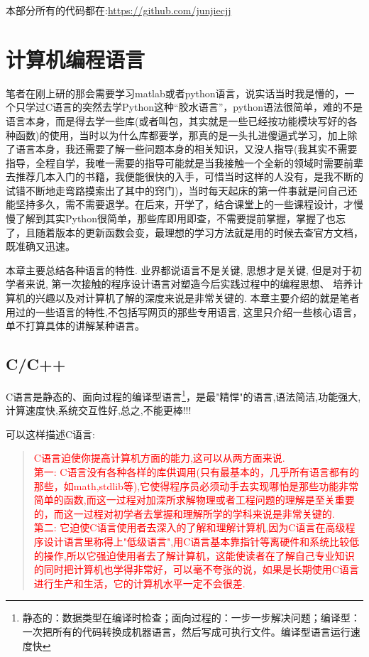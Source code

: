 \documentclass[utf8]{book}
\begin{document}
 

	\noindent 本部分所有的代码都在:{\normalsize \url{https://github.com/junjiecjj}}
\chapter{计算机编程语言}
	
	笔者在刚上研的那会需要学习matlab或者python语言，说实话当时我是懵的，一个只学过C语言的突然去学Python这种“胶水语言”，python语法很简单，难的不是语言本身，而是得去学一些库(或者叫包，其实就是一些已经按功能模块写好的各种函数)的使用，当时以为什么库都要学，那真的是一头扎进傻逼式学习，加上除了语言本身，我还需要了解一些问题本身的相关知识，又没人指导(我其实不需要指导，全程自学，我唯一需要的指导可能就是当我接触一个全新的领域时需要前辈去推荐几本入门的书籍，我便能很快的入手，可惜当时这样的人没有，是我不断的试错不断地走弯路摸索出了其中的窍门)，当时每天起床的第一件事就是问自己还能坚持多久，需不需要退学。在后来，开学了，结合课堂上的一些课程设计，才慢慢了解到其实Python很简单，那些库即用即查，不需要提前掌握，掌握了也忘了，且随着版本的更新函数会变，最理想的学习方法就是用的时候去查官方文档，既准确又迅速。
	
	本章主要总结各种语言的特性. 业界都说语言不是关键, 思想才是关键, 但是对于初学者来说, 第一次接触的程序设计语言对塑造今后实践过程中的编程思想、 培养计算机的兴趣以及对计算机了解的深度来说是非常关键的. 本章主要介绍的就是笔者用过的一些语言的特性,不包括写网页的那些专用语言, 这里只介绍一些核心语言，单不打算具体的讲解某种语言。
	
\section{C/C++}

	C语言是静态的、面向过程的编译型语言\footnote{静态的：数据类型在编译时检查；面向过程的：一步一步解决问题；编译型：一次把所有的代码转换成机器语言，然后写成可执行文件。编译型语言运行速度快}，是最"精悍"的语言,语法简洁,功能强大,计算速度快,系统交互性好,总之,不能更棒!!!

	可以这样描述C语言:
\begin{quotation}
	\textcolor{red}{  
			C语言迫使你提高计算机方面的能力,这可以从两方面来说.\\
			\indent 
			第一: C语言没有各种各样的库供调用(只有最基本的，几乎所有语言都有的那些，如math,stdlib等),它使得程序员必须动手去实现哪怕是那些功能非常简单的函数,而这一过程对加深所求解物理或者工程问题的理解是至关重要的，而这一过程对初学者去掌握和理解所学的学科来说是非常关键的.\\			
			\indent 第二: 它迫使C语言使用者去深入的了解和理解计算机,因为C语言在高级程序设计语言里称得上"低级语言",用C语言基本靠指针等离硬件和系统比较低的操作,所以它强迫使用者去了解计算机，这能使读者在了解自己专业知识的同时把计算机也学得非常好，可以毫不夸张的说，如果是长期使用C语言进行生产和生活，它的计算机水平一定不会很差.}
\end{quotation}
\end{document}
